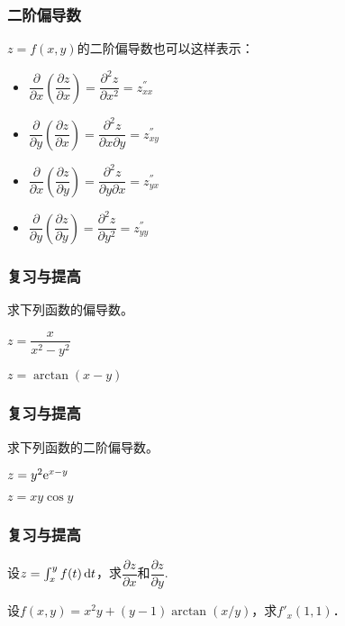\documentclass[14pt,notheorems,leqno,xcolor={rgb}]{beamer} %
\begin{document}
\begin{frame}
\frametitle{二阶偏导数}
$z=f(x,y)$的二阶偏导数也可以这样表示：\pause
\begin{itemize}[<+->]
  \item $\dfrac{\partial}{\partial x}\left(\dfrac{\partial z}{\partial x}\right)=\dfrac{\partial^2z}{\partial x^2}=z^{''}_{xx}$
  \item $\dfrac{\partial}{\partial y}\left(\dfrac{\partial z}{\partial x}\right)=\dfrac{\partial^2z}{\partial x\partial y}=z^{''}_{xy}$
  \item $\dfrac{\partial}{\partial x}\left(\dfrac{\partial z}{\partial y}\right)=\dfrac{\partial^2z}{\partial y\partial x}=z^{''}_{yx}$
  \item $\dfrac{\partial}{\partial y}\left(\dfrac{\partial z}{\partial y}\right)=\dfrac{\partial^2z}{\partial y^2}=z^{''}_{yy}$
\end{itemize}
\end{frame}


\begin{frame}
\frametitle{复习与提高}
\begin{review}
求下列函数的偏导数。
\begin{enumlite}
  \item $z=\dfrac{x}{x^2-y^2}$\pause
  \item $z=\arctan(x-y)$
\end{enumlite}
\end{review}
\end{frame}

\begin{frame}
\frametitle{复习与提高}
\begin{review}
求下列函数的二阶偏导数。
\begin{enumlite}
  \item $z=y^2\mathrm{e}^{x-y}$\pause
  \item $z=xy\cos y$
\end{enumlite}
\end{review}
\end{frame}

\begin{frame}
\frametitle{复习与提高}
\begin{puzzle}
设$z=\int_x^y f(t)\mathop{}\!\mathrm{d} t$，求$\dfrac{\partial z}{\partial x}$和$\dfrac{\partial z}{\partial y}$.
\end{puzzle}
\vpause
\begin{puzzle}
设$f(x,y)=x^2y+(y-1)\arctan\left(x/y\right)$，求$f'_x(1,1)$．
\end{puzzle}
\end{frame}
\end{document}
